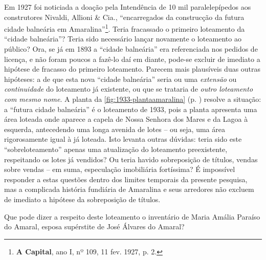 Em 1927 foi noticiada a doação pela Intendência de 10 mil paralelepípedos aos construtores Nivaldi, Allioni \& Cia., ``encarregados da construcção da futura cidade balneária em Amaralina''\footnote{\textbf{A Capital}, ano I, nº 109, 11 fev. 1927, p. 2.}. Teria fracassado o primeiro loteamento da ``cidade balneária''? Teria sido necessário lançar novamente o loteamento ao público? Ora, se já em 1893 a ``cidade balneária'' era referenciada nos pedidos de licença, e não foram poucos a fazê-lo daí em diante, pode-se excluir de imediato a hipótese de fracasso do primeiro loteamento. Parecem mais plausíveis duas outras hipóteses: a de que esta nova ``cidade balneária'' seria ou uma \textit{extensão} ou \textit{continuidade} do loteamento já existente, ou que se trataria de \textit{outro loteamento com mesmo nome}. A planta da \autoref{fig:1933-plantaamaralina} (p. \pageref{fig:1933-plantaamaralina}) resolve a situação: a ``futura cidade balneária'' é o loteamento de 1933, pois a planta apresenta uma área loteada onde aparece a capela de Nossa Senhora dos Mares e da Lagoa à esquerda, antecedendo uma longa avenida de lotes -- ou seja, uma área rigorosamente igual à já loteada. Isto levanta outras dúvidas: teria sido este ``sobreloteamento'' apenas uma atualização do loteamento preexistente, respeitando os lotes já vendidos? Ou teria havido sobreposição de títulos, vendas sobre vendas -- em suma, especulação imobiliária fortíssima? É impossível responder a estas questões dentro dos limites temporais da presente pesquisa, mas a complicada história fundiária de Amaralina e seus arredores não excluem de imediato a hipótese da sobreposição de títulos.


Que pode dizer a respeito deste loteamento o inventário de Maria Amália Paraíso do Amaral, esposa supérstite de José Álvares do Amaral? 

